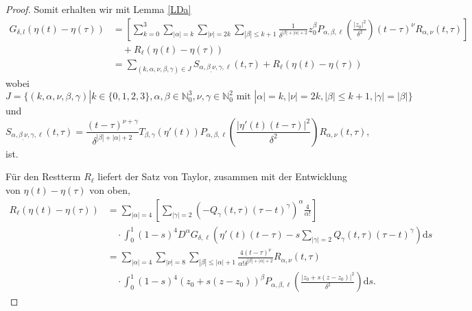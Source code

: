 \documentclass[12pt,a4paper]{scrartcl}
\newcommand{\dd}{\mathrm{d}}
\numberwithin{equation}{section}
\newcommand{\N}{\mathbb{N}} %
\begin{document}
\begin{proof}
Somit erhalten wir mit Lemma \ref{LDa}  
\begin{align*}
G_{\delta,l}(\eta(t)-\eta(\tau)) &=\left[\sum_{k=0}^3 \sum_{|\alpha|=k}\sum_{|\nu|=2k}  \sum_{|\beta|\leq k+1}\frac{1}{\delta^{|\beta|+|\alpha|+2}}z_0^\beta P_{\alpha,\beta,\ell} \left(\frac{|z_0|^2}{\delta^2}\right) (t-\tau)^\nu R_{\alpha,\nu}(t,\tau)\right] \\
&\quad +  R_\ell(\eta(t)-\eta(\tau)) \\
&=\sum_{(k,\alpha,\nu,\beta,\gamma)\in J} S_{\alpha,\beta_,\nu,\gamma,\ell}(t,\tau) + R_\ell(\eta(t)-\eta(\tau))
\end{align*}
wobei $J=\{(k,\alpha,\nu,\beta,\gamma)|k\in \{0,1,2,3\}, \alpha , \beta \in \N_0^3, \nu,\gamma \in \N_0^2 \textrm{ mit } |\alpha|=k, |\nu|=2k, |\beta| \leq k+1, |\gamma|=|\beta|\}$ und
\[
S_{\alpha,\beta_,\nu,\gamma,\ell}(t,\tau) = \frac{(t-\tau)^{\nu+\gamma}}{\delta^{|\beta|+|\alpha|+2}}T_{\beta,\gamma}(\eta'(t))P_{\alpha,\beta,\ell} \left(\frac{| \eta'(t)(t-\tau)|^2}{\delta^2}\right)R_{\alpha,\nu}(t,\tau),
\]
ist.

Für den Restterm $R_\ell$ liefert der Satz von Taylor, zusammen mit der Entwicklung von $\eta(t)-\eta(\tau)$ von oben, 
\begin{align*}
R_\ell(\eta(t)-\eta(\tau))&=\sum_{|\alpha|=4} \left[ \sum_{|\gamma|=2} (-Q_\gamma (t,\tau) (\tau- t)^\gamma)^\alpha \frac{4}{\alpha!} \right]\\
& \quad \cdot\int_0^1(1-s)^4 D^\alpha G_{\delta,\ell}\left(\eta'(t)(t-\tau) - s \sum_{|\gamma|=2}Q_\gamma (t,\tau) (\tau- t)^\gamma\right)\dd s 
 \\
 &= \sum_{|\alpha|=4}\sum_{|\nu|=8}\sum_{|\beta|\leq |\alpha|+1}\frac{4 (t-\tau)^\nu  }{\alpha! \delta^{|\beta|+|\alpha|+2}}R_{\alpha,\nu}(t,\tau) \\
 & \quad  \cdot \int_0^1(1-s)^4  (z_0+s(z-z_0))^\beta P_{\alpha,\beta,\ell} \left(\frac{|z_0+s(z-z_0)|^2}{\delta^2}\right)  \dd s.
\end{align*}

\end{proof}
\end{document}
